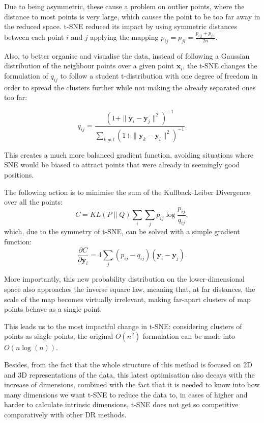         Due to being asymmetric, these cause a problem on outlier points, where the distance to most points is very large, which causes the point to be too far away in the reduced space. t-SNE reduced its impact by using symmetric distances between each point $i$ and $j$ applying the mapping $p_{ij} = p_{ji} = \frac{p_{i|j} + p_{j|i}}{2n}$.
        
        Also, to better organise and visualise the data, instead of following a Gaussian distribution of the neighbour points over a given point $\bm{x}_i$, the t-SNE changes the formulation of $q_{ij}$ to follow a student t-distribution with one degree of freedom in order to spread the clusters further while not making the already separated ones too far:
        
        \begin{equation}
            q_{ij} = \frac{(1+\| \bm{y}_i - \bm{y}_j \|^2)^{-1}}{\sum_{k\neq l} (1+\| \bm{y}_k - \bm{y}_l \|^2)^{-1}}.
        \end{equation}
        
        This creates a much more balanced gradient function, avoiding situations where SNE would be biased to attract points that were already in seemingly good positions. 

        The following action is to minimise the sum of the Kullback-Leiber Divergence over all the points:
        \begin{equation}
            C = KL(P\|Q) \sum_i \sum_j p_{ij} \log\frac{p_{ij}}{q_{ij}},
        \end{equation}
        which, due to the symmetry of t-SNE, can be solved with a simple gradient function:
        \begin{equation}
            \frac{\partial C}{\partial \bm{y}_i} = 4 \sum_j (p_{ij} - q_{ij})(\bm{y}_{i} - \bm{y}_{j}).
        \end{equation}
        
        More importantly, this new probability distribution on the lower-dimensional space also approaches the inverse square law, meaning that, at far distances, the scale of the map becomes virtually irrelevant, making far-apart clusters of map points behave as a single point. 

        This leads us to the most impactful change in t-SNE: considering clusters of points as single points, the original $O(n^2)$ formulation can be made into $O(n \log(n))$. 

        Besides, from the fact that the whole structure of this method is focused on 2D and 3D representations of the data, this latest optimisation also decays with the increase of dimensions, combined with the fact that it is needed to know into how many dimensions we want t-SNE to reduce the data to, in cases of higher and harder to calculate intrinsic dimensions, t-SNE does not get so competitive comparatively with other DR methods.

